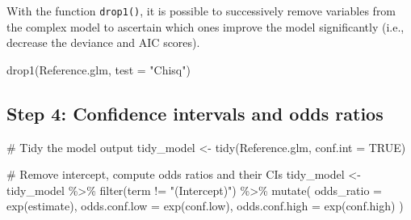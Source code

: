 \documentclass[
  11pt,
  letterpaper,
  DIV=11,
  numbers=noendperiod]{scrreprt}
\newenvironment{Shaded}{\begin{snugshade}}{\end{snugshade}}
\newcommand{\AttributeTok}[1]{\textcolor[rgb]{0.40,0.45,0.13}{#1}}
\newcommand{\CommentTok}[1]{\textcolor[rgb]{0.37,0.37,0.37}{#1}}
\newcommand{\ConstantTok}[1]{\textcolor[rgb]{0.56,0.35,0.01}{#1}}
\newcommand{\FunctionTok}[1]{\textcolor[rgb]{0.28,0.35,0.67}{#1}}
\newcommand{\NormalTok}[1]{\textcolor[rgb]{0.00,0.23,0.31}{#1}}
\newcommand{\OtherTok}[1]{\textcolor[rgb]{0.00,0.23,0.31}{#1}}
\newcommand{\SpecialCharTok}[1]{\textcolor[rgb]{0.37,0.37,0.37}{#1}}
\newcommand{\StringTok}[1]{\textcolor[rgb]{0.13,0.47,0.30}{#1}}
\begin{document}
\begin{tcolorbox}[enhanced jigsaw, toprule=.15mm, opacitybacktitle=0.6, coltitle=black, arc=.35mm, colback=white, title=\textcolor{quarto-callout-tip-color}{\faLightbulb}\hspace{0.5em}{Stepwise variable selection}, titlerule=0mm, toptitle=1mm, bottomtitle=1mm, breakable, rightrule=.15mm, opacityback=0, bottomrule=.15mm, leftrule=.75mm, colframe=quarto-callout-tip-color-frame, left=2mm, colbacktitle=quarto-callout-tip-color!10!white]

With the function \texttt{drop1()}, it is possible to successively
remove variables from the complex model to ascertain which ones improve
the model significantly (i.e., decrease the deviance and AIC scores).

\begin{Shaded}
\begin{Highlighting}[]
\FunctionTok{drop1}\NormalTok{(Reference.glm, }\AttributeTok{test =} \StringTok{"Chisq"}\NormalTok{)}
\end{Highlighting}
\end{Shaded}

\end{tcolorbox}

\subsection{Step 4: Confidence intervals and odds
ratios}\label{step-4-confidence-intervals-and-odds-ratios}

\begin{Shaded}
\begin{Highlighting}[]
\CommentTok{\# Tidy the model output}
\NormalTok{tidy\_model }\OtherTok{\textless{}{-}} \FunctionTok{tidy}\NormalTok{(Reference.glm, }\AttributeTok{conf.int =} \ConstantTok{TRUE}\NormalTok{)}

\CommentTok{\# Remove intercept, compute odds ratios and their CIs}
\NormalTok{tidy\_model }\OtherTok{\textless{}{-}}\NormalTok{ tidy\_model }\SpecialCharTok{\%\textgreater{}\%} 
  \FunctionTok{filter}\NormalTok{(term }\SpecialCharTok{!=} \StringTok{"(Intercept)"}\NormalTok{) }\SpecialCharTok{\%\textgreater{}\%} 
  \FunctionTok{mutate}\NormalTok{(}
    \AttributeTok{odds\_ratio =} \FunctionTok{exp}\NormalTok{(estimate),}
    \AttributeTok{odds.conf.low =} \FunctionTok{exp}\NormalTok{(conf.low),}
    \AttributeTok{odds.conf.high =} \FunctionTok{exp}\NormalTok{(conf.high)}
\NormalTok{  )}
\end{Highlighting}
\end{Shaded}
\end{document}
